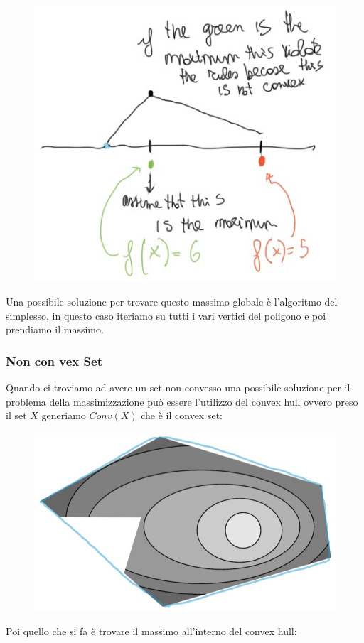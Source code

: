 \documentclass[14pt]{extreport}
\begin{document}
\begin{figure}[H]
	\centering
	\includegraphics[width=0.7\linewidth]{231.jpeg}
\end{figure}

Una possibile soluzione per trovare questo massimo globale è l'algoritmo del simplesso, in questo caso iteriamo su tutti i vari vertici del poligono e
poi prendiamo il massimo.

\subsubsection{Non con	vex Set}

Quando ci troviamo ad avere un set non convesso una possibile soluzione per il problema della massimizzazione può essere l'utilizzo del convex hull
ovvero preso il set $X$ generiamo $Conv(X)$ che è il convex set:

\begin{figure}[H]
	\centering
	\includegraphics[width=0.7\linewidth]{232.jpeg}
\end{figure}

Poi quello che si fa è trovare il massimo all'interno del convex hull:
\end{document}
